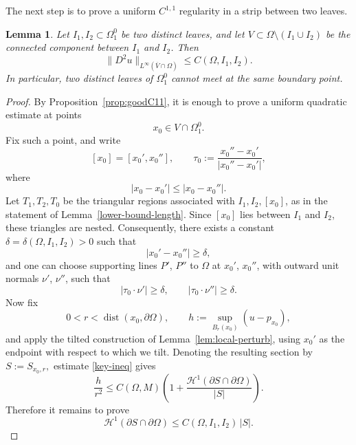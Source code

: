 \documentclass[reqno,11pt]{amsart}
\makeatletter
\def\dist{{\mathop\mathrm{dist}}}
\newtheorem{lem}[thm]{Lemma}%
\numberwithin{equation}{section}
\theoremstyle{remark}
\makeatother
\begin{document}
The next step is to prove a uniform $C^{1,1}$ regularity in a strip between two leaves.

\begin{lem}\label{lem:strip-C11}
Let \(I_1,I_2\subset \Omega_1^0\) be two distinct leaves, and let
\(V\subset \Omega\setminus (I_1\cup I_2)\) be the connected component between
\(I_1\) and \(I_2\). Then
\[
\|D^2u\|_{L^\infty(\overline V\cap\Omega)}\le C(\Omega,I_1,I_2).
\]
In particular, two distinct leaves of \(\Omega_1^0\) cannot meet at the same
boundary point.
\end{lem}

\begin{proof}
By Proposition~\ref{prop:goodC11}, it is enough to prove a uniform quadratic
estimate at points
\[
x_0\in V\cap \Omega_1^0.
\]
Fix such a point, and write
\[
[x_0]=[x_0',x_0''],
\qquad
\tau_0:=\frac{x_0''-x_0'}{|x_0''-x_0'|},
\]
where
\begin{equation}\label{x' small}
|x_0-x_0'|\le |x_0-x_0''|.
\end{equation}
Let \(T_1,T_2,T_0\) be the triangular regions associated with
\(I_1,I_2,[x_0]\), as in the statement of Lemma~\ref{lower-bound-length}.
Since \([x_0]\) lies between \(I_1\) and \(I_2\), these triangles are nested.
Consequently, there exists a constant
$\delta=\delta(\Omega,I_1,I_2)>0$
such that
\begin{equation}\label{eq:strip-length}
|x_0'-x_0''|\ge \delta,
\end{equation}
and one can choose supporting lines \(P'\), \(P''\) to \(\Omega\) at \(x_0'\),
\(x_0''\), with outward unit normals \(\nu'\), \(\nu''\), such that
\begin{equation}\label{eq:strip-angle}
|\tau_0\cdot \nu'|\ge \delta,
\qquad
|\tau_0\cdot \nu''|\ge \delta.
\end{equation}
Now fix
\[
0<r<\dist(x_0,\partial\Omega),
\qquad
h:=\sup_{B_r(x_0)}(u-p_{x_0}),
\]
and apply the tilted construction of Lemma~\ref{lem:local-perturb}, using
\(x_0'\) as the endpoint with respect to which we tilt. Denoting the resulting
section by
$S:=S_{x_0,r},$
estimate \eqref{key-ineq} gives
\begin{equation}\label{eq:strip-key}
\frac{h}{r^2}\le C(\Omega,M)\left(
1+\frac{\mathscr H^1(\partial S\cap\partial\Omega)}{|S|}
\right).
\end{equation}
Therefore it remains to prove
\begin{equation}\label{eq:strip-boundarysize}
\mathscr H^1(\partial S\cap\partial\Omega)\le C(\Omega,I_1,I_2)\,|S|.
\end{equation}


\end{proof}
\end{document}
